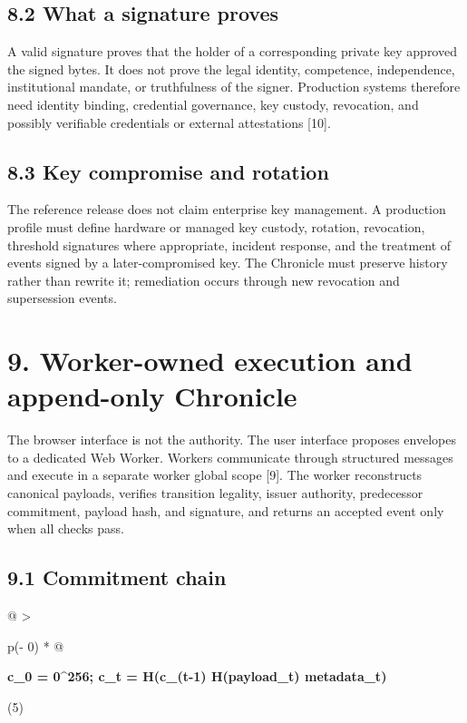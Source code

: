 \subsection{8.2 What a signature proves}\label{what-a-signature-proves}

A valid signature proves that the holder of a corresponding private key
approved the signed bytes. It does not prove the legal identity,
competence, independence, institutional mandate, or truthfulness of the
signer. Production systems therefore need identity binding, credential
governance, key custody, revocation, and possibly verifiable credentials
or external attestations {[}10{]}.

\subsection{8.3 Key compromise and
rotation}\label{key-compromise-and-rotation}

The reference release does not claim enterprise key management. A
production profile must define hardware or managed key custody,
rotation, revocation, threshold signatures where appropriate, incident
response, and the treatment of events signed by a later-compromised key.
The Chronicle must preserve history rather than rewrite it; remediation
occurs through new revocation and supersession events.

\section{9. Worker-owned execution and append-only
Chronicle}\label{worker-owned-execution-and-append-only-chronicle}

The browser interface is not the authority. The user interface proposes
envelopes to a dedicated Web Worker. Workers communicate through
structured messages and execute in a separate worker global scope
{[}9{]}. The worker reconstructs canonical payloads, verifies transition
legality, issuer authority, predecessor commitment, payload hash, and
signature, and returns an accepted event only when all checks pass.

\subsection{9.1 Commitment chain}\label{commitment-chain}

\begin{longtable}[]{@{}
  >{\raggedright\arraybackslash}p{(\columnwidth - 0\tabcolsep) * }@{}}
\toprule\noalign{}
\begin{minipage}[b]{\linewidth}\raggedright
\textbf{c\_\allowbreak{}0 = 0\^{}256; c\_\allowbreak{}t = H(c\_\allowbreak{}(t-1) \textbar\textbar{}\allowbreak{}
H(payload\_\allowbreak{}t) \textbar\textbar{}\allowbreak{} metadata\_\allowbreak{}t)}

(5)
\end{minipage} \\
\midrule\noalign{}
\endhead
\bottomrule\noalign{}
\endlastfoot
\end{longtable}

